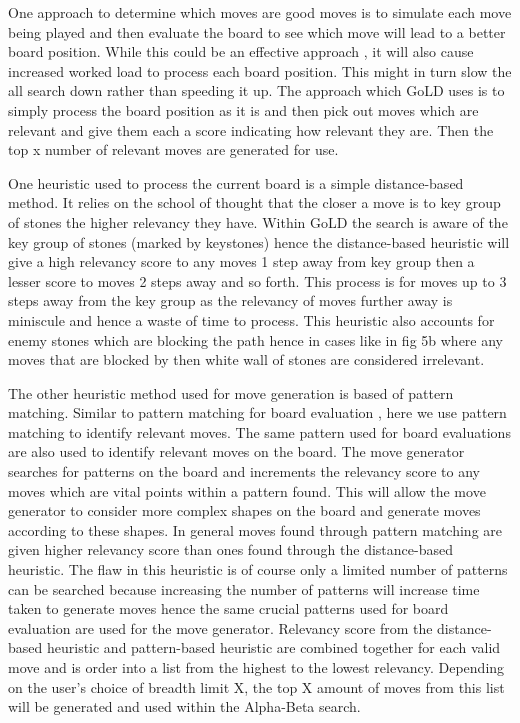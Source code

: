 \documentclass{l4proj}
\begin{document}
One approach to determine which moves are good moves is to simulate each move being played and then evaluate the board to see which  move will lead to a better board position. While this could be an effective approach , it will also cause increased worked load to process each board position. This might in turn slow the all search down rather than speeding it up. The approach which GoLD uses is to simply process the board position as it is  and then pick out moves which are relevant and give them each a score indicating how relevant they are.  Then the  top x number of relevant moves are generated for use.

One heuristic used to process the current board is a simple distance-based method. It relies on the school of thought that the closer a move is to key group of stones the higher relevancy they have. Within GoLD the search is aware of the key group of stones (marked by keystones) hence the distance-based heuristic will give a high relevancy score to any moves 1 step away from key group then a lesser score to moves 2 steps away and so forth. This process is for moves up to 3 steps away from the key group as the relevancy of moves further away is miniscule and hence a waste of time to process. This heuristic also accounts for enemy stones which are blocking the path hence in cases like in  fig 5b where any moves that are blocked by then white wall of stones are considered irrelevant.

The other heuristic method used for move generation is based of pattern matching. Similar to pattern matching for board evaluation , here we use pattern matching to identify relevant moves. The same pattern used for board evaluations are also used to identify relevant moves on the board. The move generator searches for patterns on the board and increments the relevancy score to any moves which are vital points within a pattern found. This will allow the move generator to consider more complex shapes on the board and generate moves according to these shapes. In general moves found through pattern matching are given higher relevancy score than ones found through the distance-based heuristic. The flaw in this heuristic is of course only a limited number of patterns can be searched because increasing the number of patterns will increase time taken to generate moves hence the same crucial patterns used for board evaluation are used for the move generator.
Relevancy score from the distance-based heuristic and pattern-based heuristic are combined together for each valid move and is order into a list from the highest to the lowest relevancy.  Depending on the user’s choice of breadth limit X,  the top X amount of moves from this list will be generated and used  within the Alpha-Beta search.
\end{document}
